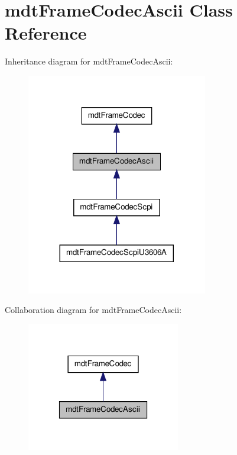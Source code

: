 \hypertarget{classmdt_frame_codec_ascii}{
\section{mdtFrameCodecAscii Class Reference}
\label{classmdt_frame_codec_ascii}
}


Inheritance diagram for mdtFrameCodecAscii:
\nopagebreak
\begin{figure}[H]
\begin{center}
\leavevmode
\includegraphics[width=224pt]{classmdt_frame_codec_ascii__inherit__graph}
\end{center}
\end{figure}


Collaboration diagram for mdtFrameCodecAscii:\nopagebreak
\begin{figure}[H]
\begin{center}
\leavevmode
\includegraphics[width=190pt]{classmdt_frame_codec_ascii__coll__graph}
\end{center}
\end{figure}
